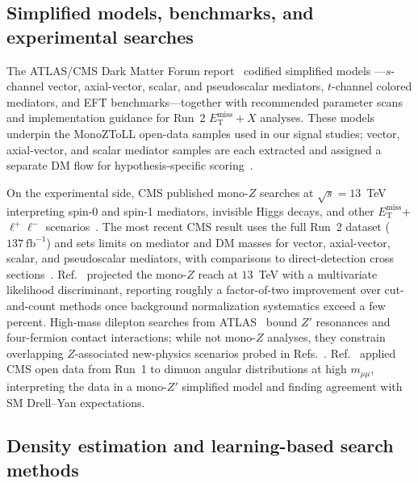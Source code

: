 \documentclass[11pt,a4paper,twocolumn]{article}
\newcommand{\MET}{\ensuremath{E_{\mathrm{T}}^{\mathrm{miss}}}}
\begin{document}
\subsection{Simplified models, benchmarks, and experimental searches}
\label{sec:lit-experiment}

The ATLAS/CMS Dark Matter Forum report~\cite{DMForum2015} codified simplified models
---$s$-channel vector, axial-vector, scalar, and pseudoscalar mediators, $t$-channel
colored mediators, and EFT benchmarks---together with recommended parameter scans and
implementation guidance for Run~2 $\MET+X$ analyses.
These models underpin the MonoZToLL open-data samples used in our signal studies; vector,
axial-vector, and scalar mediator samples are each extracted and assigned a separate DM
flow for hypothesis-specific scoring~\cite{CERNOpenDataMonoZVector,CERNOpenDataMonoZAxialMx10Mv20,CERNOpenDataMonoZAxialMx50Mv200,CERNOpenDataMonoZScalar,DMForum2015}.

On the experimental side, CMS published mono-$Z$ searches at $\sqrt{s}=13$~TeV interpreting
spin-0 and spin-1 mediators, invisible Higgs decays, and other $\MET$+$\ell^+\ell^-$
scenarios~\cite{CMS2017MonoZ,CMS2021MonoZ}.
The most recent CMS result uses the full Run~2 dataset ($137~\mathrm{fb}^{-1}$) and sets
limits on mediator and DM masses for vector, axial-vector, scalar, and pseudoscalar
mediators, with comparisons to direct-detection cross sections~\cite{CMS2021MonoZ}.
Ref.~\cite{Alves2015} projected the mono-$Z$ reach at $13$~TeV with a multivariate
likelihood discriminant, reporting roughly a factor-of-two improvement over cut-and-count
methods once background normalization systematics exceed a few percent.
High-mass dilepton searches from ATLAS~\cite{ATLAS2016Dilepton,ATLAS2017Dilepton} bound
$Z'$ resonances and four-fermion contact interactions; while not mono-$Z$ analyses, they
constrain overlapping $Z$-associated new-physics scenarios probed in
Refs.~\cite{Autran2015,Elgammal2024}.
Ref.~\cite{Elgammal2024} applied CMS open data from Run~1 to dimuon angular distributions
at high $m_{\mu\mu}$, interpreting the data in a mono-$Z'$ simplified model and finding
agreement with SM Drell--Yan expectations.

\subsection{Density estimation and learning-based search methods}
\label{sec:lit-ml}
\end{document}

